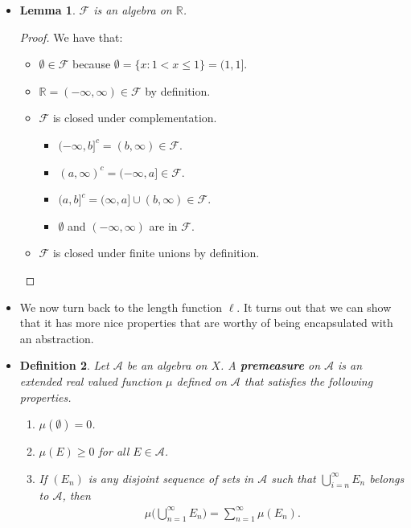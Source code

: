 \documentclass[10pt]{article}
\newtheorem{lemma}{Lemma}
\newtheorem{definition}[lemma]{Definition}
\newcommand{\mcal}[1]{\mathcal{#1}}
\newcommand{\Real}{\mathbb{R}}
\begin{document}
\begin{itemize}
  \item \begin{lemma} \label{lemma:f-is-algebra}
    $\mcal{F}$ is an algebra on $\Real$.
  \end{lemma}
  
  \begin{proof} We have that:    
  \begin{itemize}
    \item $\emptyset \in \mcal{F}$ because $\emptyset = \{ x : 1 < x \leq 1 \} = (1,1]$.
    \item $\Real = (-\infty, \infty) \in \mcal{F}$ by definition.
    \item $\mcal{F}$ is closed under complementation.
    \begin{itemize}
      \item $(-\infty,b]^c = (b,\infty) \in \mcal{F}$.
      \item $(a,\infty)^c = (-\infty,a] \in \mcal{F}$.
      \item $(a,b]^c = (\infty,a] \cup (b,\infty) \in \mcal{F}$.
      \item $\emptyset$ and $(-\infty,\infty)$ are in $\mcal{F}$.
    \end{itemize}
    \item $\mcal{F}$ is closed under finite unions by definition.
  \end{itemize}
  \end{proof}

  \item We now turn back to the length function $\ell$. It turns out that we can show that it has more nice properties that are worthy of being encapsulated with an abstraction.

  \item \begin{definition}
    Let $\mcal{A}$ be an algebra on $X$. A {\bf premeasure} on $\mcal{A}$ is an extended real valued function $\mu$ defined on $\mcal{A}$ that satisfies the following properties.
    \begin{enumerate}
      \item $\mu(\emptyset) = 0$.
      \item $\mu(E) \geq 0$ for all $E \in \mcal{A}$.
      \item If $(E_n)$ is any disjoint sequence of sets in $\mcal{A}$ such that $\bigcup_{i=n}^\infty E_n$ belongs to $\mcal{A}$, then
      \begin{align*}
        \mu\bigg( \bigcup_{n=1}^\infty E_n \bigg) = \sum_{n=1}^\infty \mu(E_n).
      \end{align*}
    \end{enumerate}
  \end{definition}  


\end{itemize}
\end{document}
